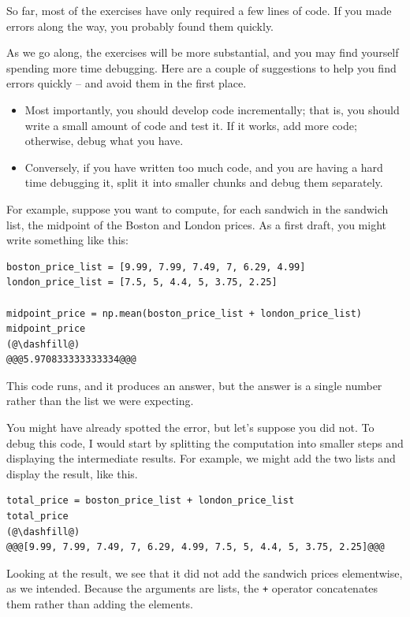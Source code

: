 So far, most of the exercises have only required a few lines of code. If
you made errors along the way, you probably found them quickly.

As we go along, the exercises will be more substantial, and you may find
yourself spending more time debugging. Here are a couple of suggestions
to help you find errors quickly -- and avoid them in the first place.

\begin{itemize}
\item
  Most importantly, you should develop code incrementally; that is, you
  should write a small amount of code and test it. If it works, add more
  code; otherwise, debug what you have.
\item
  Conversely, if you have written too much code, and you are having a
  hard time debugging it, split it into smaller chunks and debug them
  separately.
\end{itemize}

For example, suppose you want to compute, for each sandwich in the
sandwich list, the midpoint of the Boston and London prices. As a first
draft, you might write something like this:

\begin{lstlisting}[]
boston_price_list = [9.99, 7.99, 7.49, 7, 6.29, 4.99]
london_price_list = [7.5, 5, 4.4, 5, 3.75, 2.25]

midpoint_price = np.mean(boston_price_list + london_price_list)
midpoint_price
(@\dashfill@)
@@@5.970833333333334@@@
\end{lstlisting}

This code runs, and it produces an answer, but the answer is a single
number rather than the list we were expecting.

You might have already spotted the error, but let's suppose you did not.
To debug this code, I would start by splitting the computation into
smaller steps and displaying the intermediate results. For example, we
might add the two lists and display the result, like this.

\begin{lstlisting}[]
total_price = boston_price_list + london_price_list
total_price
(@\dashfill@)
@@@[9.99, 7.99, 7.49, 7, 6.29, 4.99, 7.5, 5, 4.4, 5, 3.75, 2.25]@@@
\end{lstlisting}

Looking at the result, we see that it did not add the sandwich prices
elementwise, as we intended. Because the arguments are lists, the
\passthrough{\lstinline!+!} operator concatenates them rather than
adding the elements.

